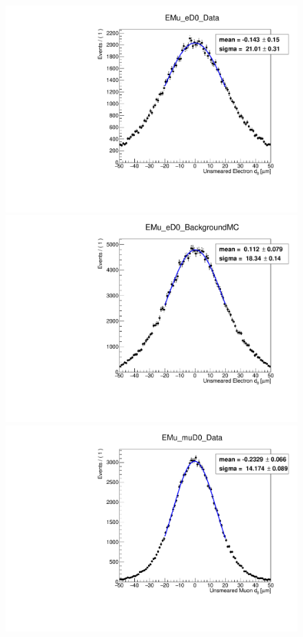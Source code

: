 \begin{figure}[hbtp]
\centering
\includegraphics[scale=0.3]{figures/corrections/d0_smearing/emu_2018/gaussian_fit_EMu_eD0_Data.pdf}
\includegraphics[scale=0.3]{figures/corrections/d0_smearing/emu_2018/gaussian_fit_EMu_eD0_BackgroundMC.pdf}
\includegraphics[scale=0.3]{figures/corrections/d0_smearing/emu_2018/gaussian_fit_EMu_muD0_Data.pdf} 

\end{figure}
